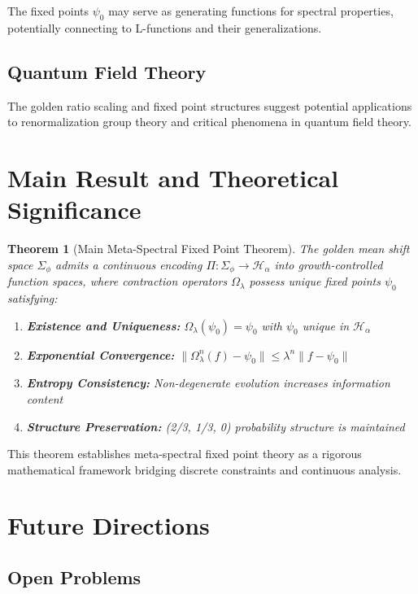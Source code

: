 \documentclass[12pt]{article}
\theoremstyle{plain}
\newtheorem{theorem}{Theorem}[section]
\theoremstyle{definition}
\begin{document}
The fixed points $\psi_0$ may serve as generating functions for spectral properties, potentially connecting to L-functions and their generalizations.

\subsection{Quantum Field Theory}

The golden ratio scaling and fixed point structures suggest potential applications to renormalization group theory and critical phenomena in quantum field theory.

\section{Main Result and Theoretical Significance}

\begin{theorem}[Main Meta-Spectral Fixed Point Theorem]
\label{thm:main}
The golden mean shift space $\Sigma_\phi$ admits a continuous encoding $\Pi: \Sigma_\phi \to \mathcal{H}_\alpha$ into growth-controlled function spaces, where contraction operators $\Omega_\lambda$ possess unique fixed points $\psi_0$ satisfying:
\begin{enumerate}
\item \textbf{Existence and Uniqueness:} $\Omega_\lambda(\psi_0) = \psi_0$ with $\psi_0$ unique in $\mathcal{H}_\alpha$
\item \textbf{Exponential Convergence:} $\|\Omega_\lambda^n(f) - \psi_0\| \leq \lambda^n \|f - \psi_0\|$
\item \textbf{Entropy Consistency:} Non-degenerate evolution increases information content
\item \textbf{Structure Preservation:} (2/3, 1/3, 0) probability structure is maintained
\end{enumerate}
\end{theorem}

This theorem establishes meta-spectral fixed point theory as a rigorous mathematical framework bridging discrete constraints and continuous analysis.

\section{Future Directions}

\subsection{Open Problems}
\end{document}
